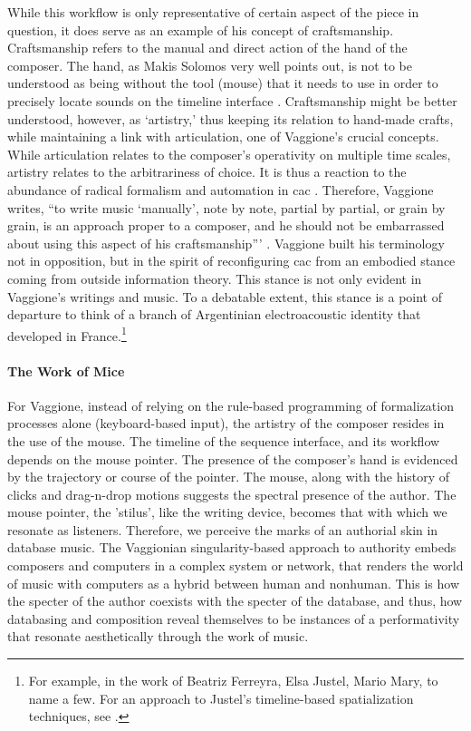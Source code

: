 While this workflow is only representative of certain aspect of the piece in question, it does serve as an example of his concept of craftsmanship. Craftsmanship refers to the manual and direct action of the hand of the composer. The hand, as Makis Solomos very well points out, is not to be understood as being without the tool (mouse) that it needs to use in order to precisely locate sounds on the timeline interface \parencite[4]{Sol05:AnI}. Craftsmanship might be better understood, however, as `artistry,' thus keeping its relation to hand-made crafts, while maintaining a link with articulation, one of Vaggione's crucial concepts. While articulation relates to the composer's operativity on multiple time scales, artistry relates to the arbitrariness of choice. It is thus a reaction to the abundance of radical formalism and automation in \gls{cac} \parencite[3]{Sol05:AnI}. Therefore, Vaggione writes, ``to write music `manually', note by note, partial by partial, or grain by grain, is an approach proper to a composer, and he should not be embarrassed about using this aspect of his craftsmanship''' \parencite[3]{Sol05:AnI}. Vaggione built his terminology not in opposition, but in the spirit of reconfiguring \gls{cac} from an embodied stance coming from outside information theory. This stance is not only evident in Vaggione's writings and music. To a debatable extent, this stance is a point of departure to think of a branch of Argentinian electroacoustic identity that developed in France.\footnote{For example, in the work of Beatriz Ferreyra, Elsa Justel, Mario Mary, to name a few. For an approach to Justel's timeline-based spatialization techniques, see \parencite{fdch/papers/elsa}.} 


\paragraph{The Work of Mice}
For Vaggione, instead of relying on the rule-based programming of formalization processes alone (keyboard-based input), the artistry of the composer resides in the use of the mouse. The timeline of the sequence interface, and its workflow depends on the mouse pointer. The presence of the composer's hand is evidenced by the trajectory or course of the pointer. The mouse, along with the history of clicks and drag-n-drop motions suggests the spectral presence of the author. The mouse pointer, the 'stilus', like the writing device, becomes that with which we resonate as listeners. Therefore, we perceive the marks of an authorial skin in database music. The Vaggionian singularity-based approach to authority embeds composers and computers in a complex system or network, that renders the world of music with computers as a hybrid between human and nonhuman. This is how the specter of the author coexists with the specter of the database, and thus, how databasing and composition reveal themselves to be instances of a performativity that resonate aesthetically through the work of music. 
